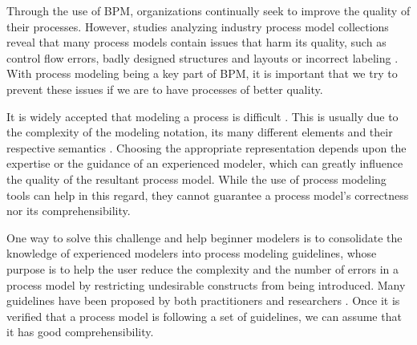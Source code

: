 \documentclass[a4paper,twoside]{article}
\begin{document}
Through the use of BPM, organizations continually seek to improve the quality of their processes. However, studies analyzing industry process model collections reveal that many process models contain issues that harm its quality, such as control flow errors, badly designed structures and layouts or incorrect labeling \cite{Mendling2008a} \cite{Leopold2016}. With process modeling being a key part of BPM, it is important that we try to prevent these issues if we are to have processes of better quality.


It is widely accepted that modeling a process is difficult \cite{Mendling2010}. This is usually due to the complexity of the modeling notation, its many different elements and their respective semantics \cite{Leopold2016}. Choosing the appropriate representation depends upon the expertise or the guidance of an experienced modeler, which can greatly influence the quality of the resultant process model. While the use of process modeling tools can help in this regard, they cannot guarantee a process model's correctness nor its comprehensibility.



One way to solve this challenge and help beginner modelers is to consolidate the knowledge of experienced modelers into process modeling guidelines, whose purpose is to help the user reduce the complexity and the number of errors in a process model by restricting undesirable constructs from being introduced. Many guidelines have been proposed by both practitioners \cite{Silver2009} \cite{White2008} \cite{Allweyer2010} and researchers \cite{Becker2000} \cite{Mendling2007} \cite{Vanderfeesten2008} \cite{Correia2012}. Once it is verified that a process model is following a set of guidelines, we can assume that it has good comprehensibility.
\end{document}
